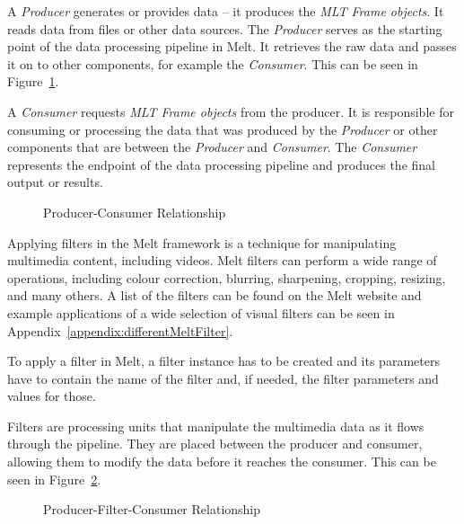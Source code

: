 \documentclass[../MasterThesis.tex]{subfiles}
\begin{document}
A \textit{Producer} generates or provides data -- it produces the \textit{MLT Frame objects}. 
It reads data from files or other data sources. The \textit{Producer} serves as the starting point of the data processing pipeline in Melt. It retrieves the raw data and passes it on to other components, for example the \textit{Consumer}. This can be seen in Figure~\ref{fig:producer_consumer}.

A \textit{Consumer} requests \textit{MLT Frame objects} from the producer.
It is responsible for consuming or processing the data that was produced by the \textit{Producer} or other components that are between the \textit{Producer} and \textit{Consumer}. 
The \textit{Consumer} represents the endpoint of the data processing pipeline and produces the final output or results.



\begin{figure}[H]
	\centering
	\caption{Producer-Consumer Relationship}
	\label{fig:producer_consumer}
\end{figure}

Applying filters in the Melt framework is a technique for manipulating multimedia content, including videos. 
Melt filters can perform a wide range of operations, including colour correction, blurring, sharpening, cropping, resizing, and many others. A list of the filters can be found on the Melt website and example applications of a wide selection of visual filters can be seen in Appendix~\ref{appendix:differentMeltFilter}.~\cite{melt_filters}

To apply a filter in Melt, a filter instance has to be created and its parameters have to contain the name of the filter and, if needed, the filter parameters and values for those.

Filters are processing units that manipulate the multimedia data as it flows through the pipeline. They are placed between the producer and consumer, allowing them to modify the data before it reaches the consumer. This can be seen in Figure~\ref{fig:producer_filter_consumer}.



\begin{figure}[H]
	\centering
	\caption{Producer-Filter-Consumer Relationship}
	\label{fig:producer_filter_consumer}
\end{figure}
\end{document}
